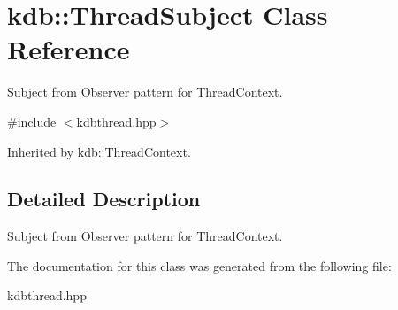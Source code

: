 \hypertarget{classkdb_1_1ThreadSubject}{\section{kdb\-:\-:Thread\-Subject Class Reference}
\label{classkdb_1_1ThreadSubject}
}


Subject from Observer pattern for Thread\-Context.  




{\ttfamily \#include $<$kdbthread.\-hpp$>$}



Inherited by kdb\-::\-Thread\-Context.



\subsection{Detailed Description}
Subject from Observer pattern for Thread\-Context. 

The documentation for this class was generated from the following file\-:\begin{DoxyCompactItemize}
\item 
kdbthread.\-hpp\end{DoxyCompactItemize}
